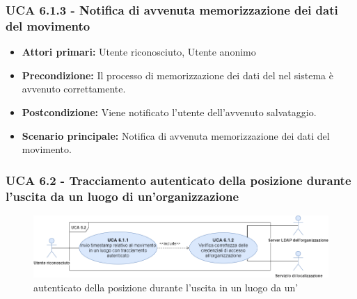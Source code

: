 \subsubsection{UCA 6.1.3 - Notifica di avvenuta memorizzazione dei dati del movimento}
\begin{itemize}
	\item \textbf{Attori primari:} Utente riconosciuto, Utente anonimo
	\item \textbf{Precondizione:} Il processo di memorizzazione dei dati del  nel sistema è avvenuto correttamente.
	\item \textbf{Postcondizione:} Viene notificato l'utente dell'avvenuto salvataggio.
	\item \textbf{Scenario principale:} Notifica di avvenuta memorizzazione dei dati del movimento.
\end{itemize}


\subsubsection{UCA 6.2 - Tracciamento autenticato della posizione durante l'uscita da un luogo di un'organizzazione}

\begin{figure}[h]
	\centering
	\includegraphics[scale=0.4, center]{Sezioni/UseCase/Immagini/UCA6.2.png}
	\caption{ autenticato della posizione durante l'uscita in un luogo da un'}
\end{figure} 

